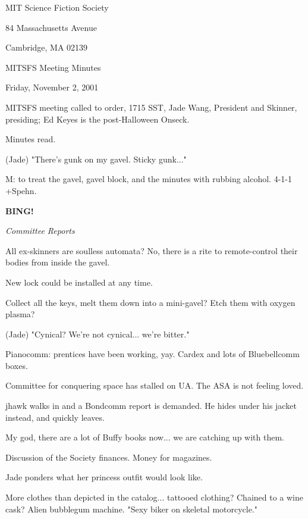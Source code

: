 \documentclass[12pt]{article}
\newcommand{\bing}{{\bf BING!} }
\newcommand{\goto}[1]{\bing \vskip 12pt \centerline{{\em{#1}}}}
\begin{document}
\begin{center}

MIT Science Fiction Society 

84 Massachusetts Avenue

Cambridge, MA 02139

\vspace{12pt}

MITSFS Meeting Minutes 

Friday, November 2, 2001

\end{center}
 
\vspace{18pt}

\setlength{\parskip}{6pt}

\noindent
MITSFS meeting called to order, 1715 SST, Jade Wang, President and Skinner, presiding; Ed Keyes is the post-Halloween Onseck.

Minutes read.

(Jade) "There's gunk on my gavel. Sticky gunk..."

M: to treat the gavel, gavel block, and the minutes with rubbing alcohol. 4-1-1 +Spehn.

\goto{Committee Reports}

All ex-skinners are soulless automata? No, there is a rite to remote-control their bodies from inside the gavel.

New lock could be installed at any time.

Collect all the keys, melt them down into a mini-gavel? Etch them with oxygen plasma?

(Jade) "Cynical? We're not cynical... we're bitter."

Pianocomm: prentices have been working, yay. Cardex and lots of Bluebellcomm boxes.

Committee for conquering space has stalled on UA. The ASA is not feeling loved.

jhawk walks in and a Bondcomm report is demanded. He hides under his jacket instead, and quickly leaves.

My god, there are a lot of Buffy books now... we are catching up with them.

Discussion of the Society finances. Money for magazines.

Jade ponders what her princess outfit would look like.

More clothes than depicted in the catalog... tattooed clothing? Chained to a wine cask? Alien bubblegum machine. "Sexy biker on skeletal motorcycle."
\end{document}

